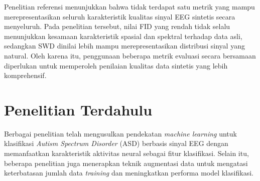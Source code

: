 \begin{table}[H]
\centering
\footnotesize
\caption{Metrik evaluasi data sintetis EEG. Sumber: \href{https://doi.org/10.48550/arXiv.1806.01875}{Hartmann et al. (2018)}}
\label{tab:evaluation_metrics}
\renewcommand{\arraystretch}{1.5}
\end{table}

Penelitian referensi \cite{eeg_gan} menunjukkan bahwa tidak terdapat satu metrik yang mampu merepresentasikan seluruh karakteristik kualitas sinyal EEG sintetis secara menyeluruh. Pada penelitian tersebut, nilai FID yang rendah tidak selalu menunjukkan kesamaan karakteristik spasial dan spektral terhadap data asli, sedangkan SWD dinilai lebih mampu merepresentasikan distribusi sinyal yang natural. Oleh karena itu, penggunaan beberapa metrik evaluasi secara bersamaan diperlukan untuk memperoleh penilaian kualitas data sintetis yang lebih komprehensif.

\section{Penelitian Terdahulu}
\label{Penelitian Terdahulu}

Berbagai penelitian telah mengusulkan pendekatan \textit{machine learning} untuk klasifikasi \textit{Autism Spectrum Disorder} (ASD) berbasis sinyal EEG dengan memanfaatkan karakteristik aktivitas neural sebagai fitur klasifikasi. Selain itu, beberapa penelitian juga menerapkan teknik augmentasi data untuk mengatasi keterbatasan jumlah data \textit{training} dan meningkatkan performa model klasifikasi.

